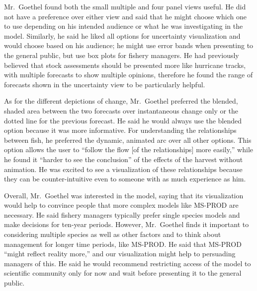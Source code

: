 Mr.\ Goethel found both the small multiple and four panel views useful.  He did not have a preference over either view and said that he might choose which one to use depending on his intended audience or what he was investigating in the model.  Similarly, he said he liked all options for uncertainty visualization and would choose based on his audience; he might use error bands when presenting to the general public, but use box plots for fishery managers.  He had previously believed that stock assessments should be presented more like hurricane tracks, with multiple forecasts to show multiple opinions, therefore he found the range of forecasts shown in the uncertainty view to be particularly helpful.

As for the different depictions of change, Mr.\ Goethel preferred the blended, shaded area between the two forecasts over instantaneous change only or the dotted line for the previous forecast.  He said he would always use the blended option because it was more informative.  For understanding the relationships between fish, he preferred the dynamic, animated arc over all other options.  This option allows the user to ``follow the flow [of the relationships] more easily,'' while he found it ``harder to see the conclusion'' of the effects of the harvest without animation.  He was excited to see a visualization of these relationships because they can be counter-intuitive even to someone with as much experience as him.

Overall, Mr.\ Goethel was interested in the model, saying that its visualization would help to convince people that more complex models like MS-PROD are necessary.  He said fishery managers typically prefer single species models and make decisions for ten-year periods.  However, Mr.\ Goethel finds it important to considering multiple species as well as other factors and to think about management for longer time periods, like MS-PROD.  He said that MS-PROD ``might reflect reality more,'' and our visualization might help to persuading managers of this.  He said he would recommend restricting access of the model to scientific community only for now and wait before presenting it to the general public.
